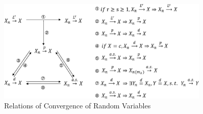\begin{figure}[htp]
	\centering
	\includegraphics[width=0.9\textwidth]{./probability-theory/figures/relation-of-convergences.eps}
	\caption{Relations of Convergence of Random Variables}
\end{figure}



